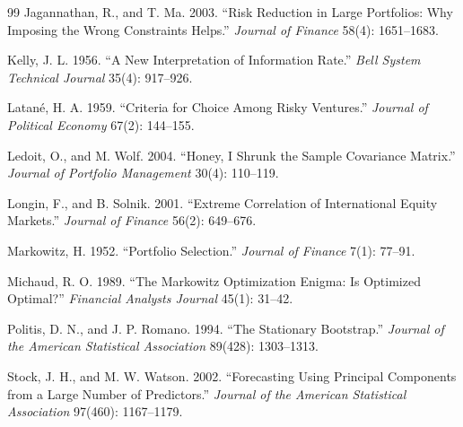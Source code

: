 \documentclass[11pt]{article}
\begin{document}
\begin{thebibliography}{99}
Jagannathan, R., and T. Ma. 2003.
``Risk Reduction in Large Portfolios: Why Imposing the Wrong Constraints Helps.''
\textit{Journal of Finance} 58(4): 1651--1683.

Kelly, J. L. 1956.
``A New Interpretation of Information Rate.''
\textit{Bell System Technical Journal} 35(4): 917--926.

Latan\'e, H. A. 1959.
``Criteria for Choice Among Risky Ventures.''
\textit{Journal of Political Economy} 67(2): 144--155.

Ledoit, O., and M. Wolf. 2004.
``Honey, I Shrunk the Sample Covariance Matrix.''
\textit{Journal of Portfolio Management} 30(4): 110--119.

Longin, F., and B. Solnik. 2001.
``Extreme Correlation of International Equity Markets.''
\textit{Journal of Finance} 56(2): 649--676.

Markowitz, H. 1952.
``Portfolio Selection.''
\textit{Journal of Finance} 7(1): 77--91.

Michaud, R. O. 1989.
``The Markowitz Optimization Enigma: Is Optimized Optimal?''
\textit{Financial Analysts Journal} 45(1): 31--42.

Politis, D. N., and J. P. Romano. 1994.
``The Stationary Bootstrap.''
\textit{Journal of the American Statistical Association} 89(428): 1303--1313.

Stock, J. H., and M. W. Watson. 2002.
``Forecasting Using Principal Components from a Large Number of Predictors.''
\textit{Journal of the American Statistical Association} 97(460): 1167--1179.

\end{thebibliography}
\end{document}
